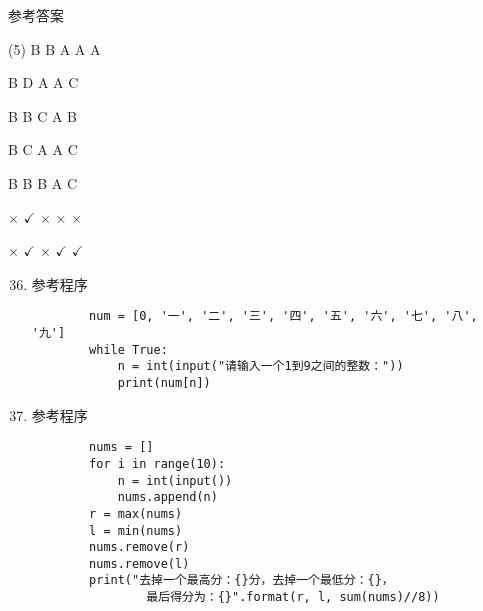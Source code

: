 \documentclass[11pt]{ctexart}
\begin{document}
\begin{center}
    \Huge \heiti 参考答案
\end{center}

    \begin{tasks}[label=\arabic*.](5)
        \task B
        \task B
        \task A
        \task A
        \task A

        \task B
        \task D
        \task A
        \task A
        \task C

        \task B
        \task B
        \task C
        \task A
        \task B

        \task B
        \task C
        \task A
        \task A
        \task C

        \task B
        \task B
        \task B
        \task A
        \task C

        \task $\times$
        \task $\checkmark$
        \task $\times$
        \task $\times$
        \task $\times$

        \task $\times$
        \task $\checkmark$
        \task $\times$
        \task $\checkmark$
        \task $\checkmark$
    \end{tasks}

\begin{enumerate}
    \setcounter{enumi}{35}
    \item 参考程序
    \begin{lstlisting}
        num = [0, '一', '二', '三', '四', '五', '六', '七', '八', '九']
        while True:
            n = int(input("请输入一个1到9之间的整数："))
            print(num[n])
    \end{lstlisting}

    \item 参考程序
    \begin{lstlisting}
        nums = []
        for i in range(10):
            n = int(input())
            nums.append(n)
        r = max(nums)
        l = min(nums)
        nums.remove(r)
        nums.remove(l)
        print("去掉一个最高分：{}分，去掉一个最低分：{}，
                最后得分为：{}".format(r, l, sum(nums)//8))
    \end{lstlisting}
\end{enumerate}
\end{document}

